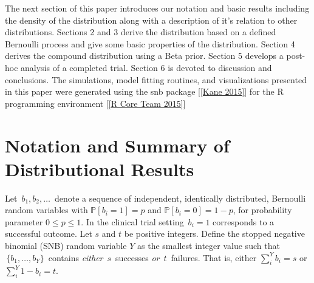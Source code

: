 \documentclass[12pt]{article}         %
\begin{document}
The next section of this paper introduces our notation and basic results 
including the density of the distribution along with a description of 
it's relation to other distributions. Sections 2 and 3 derive the distribution 
based on a defined Bernoulli process and give some basic properties of the 
distribution. Section 4 derives the compound distribution using a Beta prior. 
Section 5 develops a post-hoc analysis of a completed trial. Section 6 is 
devoted to discussion and conclusions. The simulations, model fitting 
routines, and visualizations presented in this paper were generated using the 
snb package [\ref{Kane 2015}] for the R programming 
environment [\ref{R Core Team 2015}]



\section   {Notation and Summary of Distributional Results}
\label{notation.section}

Let $\,b_1, b_2, \ldots \,$ denote a sequence of independent, identically 
distributed, Bernoulli random variables with $\mathbb{P}[b_i=1]=p$ and
$\mathbb{P}[b_i = 0] = 1-p$, for 
probability parameter $0\leq p \leq 1$. In the clinical trial setting 
$\,b_i = 1$ corresponds to a successful outcome.  Let $s$ and $t$ be 
positive integers.  Define the stopped negative binomial (SNB) random 
variable $Y$ as the smallest 
integer value such that $\,\{b_1, \ldots , b_Y\}\,$ contains {\em either} 
$\,s\,$ successes {\em or} $\,t\,$ failures. That is, either 
$\sum_i^Y b_i = s$ or $\sum_i^Y 1-b_i = t$.
\end{document}

